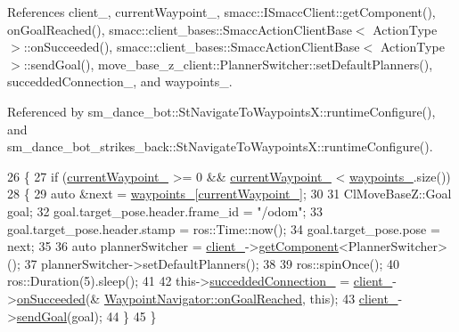 References client\+\_\+, current\+Waypoint\+\_\+, smacc\+::\+I\+Smacc\+Client\+::get\+Component(), on\+Goal\+Reached(), smacc\+::client\+\_\+bases\+::\+Smacc\+Action\+Client\+Base$<$ Action\+Type $>$\+::on\+Succeeded(), smacc\+::client\+\_\+bases\+::\+Smacc\+Action\+Client\+Base$<$ Action\+Type $>$\+::send\+Goal(), move\+\_\+base\+\_\+z\+\_\+client\+::\+Planner\+Switcher\+::set\+Default\+Planners(), succedded\+Connection\+\_\+, and waypoints\+\_\+.



Referenced by sm\+\_\+dance\+\_\+bot\+::\+St\+Navigate\+To\+Waypoints\+X\+::runtime\+Configure(), and sm\+\_\+dance\+\_\+bot\+\_\+strikes\+\_\+back\+::\+St\+Navigate\+To\+Waypoints\+X\+::runtime\+Configure().


\begin{DoxyCode}
26 \{
27   \textcolor{keywordflow}{if} (\hyperlink{classmove__base__z__client_1_1WaypointNavigator_a7da763128724f7b08c32c79cb3a88934}{currentWaypoint\_} >= 0 && \hyperlink{classmove__base__z__client_1_1WaypointNavigator_a7da763128724f7b08c32c79cb3a88934}{currentWaypoint\_} < 
      \hyperlink{classmove__base__z__client_1_1WaypointNavigator_a83e4e39987eaf1c8856d32d581eb4cd0}{waypoints\_}.size())
28   \{
29     \textcolor{keyword}{auto} &next = \hyperlink{classmove__base__z__client_1_1WaypointNavigator_a83e4e39987eaf1c8856d32d581eb4cd0}{waypoints\_}[\hyperlink{classmove__base__z__client_1_1WaypointNavigator_a7da763128724f7b08c32c79cb3a88934}{currentWaypoint\_}];
30 
31     ClMoveBaseZ::Goal goal;
32     goal.target\_pose.header.frame\_id = \textcolor{stringliteral}{"/odom"};
33     goal.target\_pose.header.stamp = ros::Time::now();
34     goal.target\_pose.pose = next;
35 
36     \textcolor{keyword}{auto} plannerSwitcher = \hyperlink{classmove__base__z__client_1_1WaypointNavigator_aadb289ffdaeda3a751fe569a2ee84c48}{client\_}->\hyperlink{classsmacc_1_1ISmaccClient_adef78db601749ca63c19e74a27cb88cc}{getComponent}<PlannerSwitcher>();
37     plannerSwitcher->setDefaultPlanners();
38 
39     ros::spinOnce();
40     ros::Duration(5).sleep();
41 
42     this->\hyperlink{classmove__base__z__client_1_1WaypointNavigator_a139d492345875777d9c9a79f9b2d494b}{succeddedConnection\_} = \hyperlink{classmove__base__z__client_1_1WaypointNavigator_aadb289ffdaeda3a751fe569a2ee84c48}{client\_}->\hyperlink{classsmacc_1_1client__bases_1_1SmaccActionClientBase_af6d77c27d21b2e4f621f53c5f1df088b}{onSucceeded}(&
      \hyperlink{classmove__base__z__client_1_1WaypointNavigator_ae4c5a879ff016f197c1cec54b2adaa1b}{WaypointNavigator::onGoalReached}, \textcolor{keyword}{this});
43     \hyperlink{classmove__base__z__client_1_1WaypointNavigator_aadb289ffdaeda3a751fe569a2ee84c48}{client\_}->\hyperlink{classsmacc_1_1client__bases_1_1SmaccActionClientBase_a9c47a5094ac8afb01680307fe5eca922}{sendGoal}(goal);
44   \}
45 \}
\end{DoxyCode}
